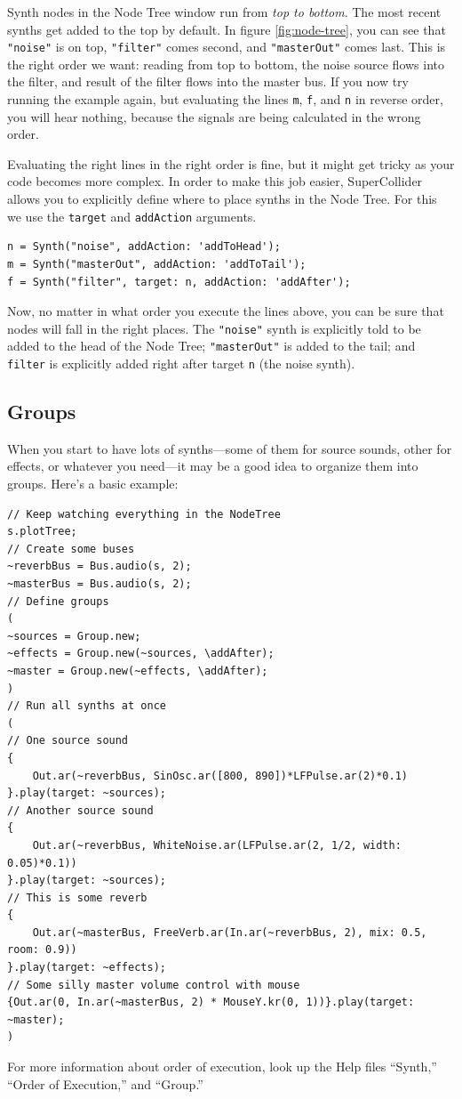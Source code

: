 Synth nodes in the Node Tree window run from \emph{top to bottom}. The most recent synths get added to the top by default. In figure \ref{fig:node-tree}, you can see that \texttt{"noise"} is on top, \texttt{"filter"} comes second, and \texttt{"masterOut"} comes last. This is the right order we want: reading from top to bottom, the noise source flows into the filter, and result of the filter flows into the master bus. If you now try running the example again, but evaluating the lines \texttt{m}, \texttt{f}, and \texttt{n} in reverse order, you will hear nothing, because the signals are being calculated in the wrong order.

Evaluating the right lines in the right order is fine, but it might get tricky as your code becomes more complex. In order to make this job easier, SuperCollider allows you to explicitly define where to place synths in the Node Tree. For this we use the \texttt{target} and \texttt{addAction} arguments.

\begin{lstlisting}[style=SuperCollider-IDE, basicstyle=\scttfamily\footnotesize]
n = Synth("noise", addAction: 'addToHead');
m = Synth("masterOut", addAction: 'addToTail');
f = Synth("filter", target: n, addAction: 'addAfter');
\end{lstlisting}
Now, no matter in what order you execute the lines above, you can be sure that nodes will fall in the right places. The \texttt{"noise"} synth is explicitly told to be added to the head of the Node Tree; \texttt{"masterOut"} is added to the tail; and \texttt{filter} is explicitly added right after target \texttt{n} (the noise synth).

\subsection{Groups}

When you start to have lots of synths---some of them for source sounds, other for effects, or whatever you need---it may be a good idea to organize them into groups. Here's a basic example:

\begin{lstlisting}[style=SuperCollider-IDE, basicstyle=\scttfamily\footnotesize]
// Keep watching everything in the NodeTree
s.plotTree;
// Create some buses
~reverbBus = Bus.audio(s, 2);
~masterBus = Bus.audio(s, 2);
// Define groups
(
~sources = Group.new;
~effects = Group.new(~sources, \addAfter);
~master = Group.new(~effects, \addAfter);
)
// Run all synths at once
(
// One source sound
{
	Out.ar(~reverbBus, SinOsc.ar([800, 890])*LFPulse.ar(2)*0.1)
}.play(target: ~sources);
// Another source sound
{
	Out.ar(~reverbBus, WhiteNoise.ar(LFPulse.ar(2, 1/2, width: 0.05)*0.1))
}.play(target: ~sources);
// This is some reverb
{
	Out.ar(~masterBus, FreeVerb.ar(In.ar(~reverbBus, 2), mix: 0.5, room: 0.9))
}.play(target: ~effects);
// Some silly master volume control with mouse
{Out.ar(0, In.ar(~masterBus, 2) * MouseY.kr(0, 1))}.play(target: ~master);
)
\end{lstlisting}

For more information about order of execution, look up the Help files ``Synth,'' ``Order of Execution,'' and ``Group.''